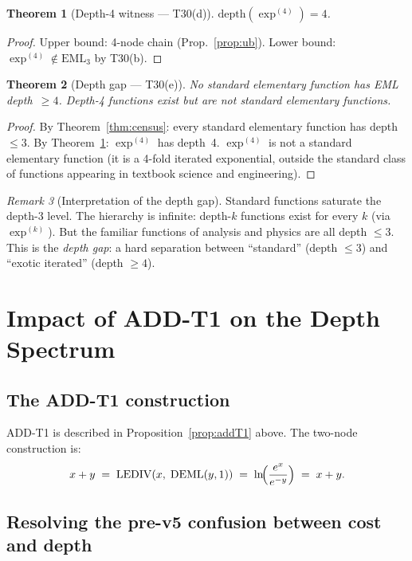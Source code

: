 \documentclass[12pt,a4paper]{article}
\newtheorem{theorem}{Theorem}[section]
\theoremstyle{definition}
\theoremstyle{remark}
\newtheorem{remark}[theorem]{Remark}
\begin{document}
\begin{theorem}[Depth-4 witness --- T30(d)]\label{thm:d4}
$\mathrm{depth}(\exp^{(4)}) = 4$.
\end{theorem}
\begin{proof}
Upper bound: 4-node chain (Prop.~\ref{prop:ub}).
Lower bound: $\exp^{(4)} \notin \mathrm{EML}_3$ by T30(b).
\end{proof}

\begin{theorem}[Depth gap --- T30(e)]\label{thm:gap}
No standard elementary function has EML depth~$\geq 4$.
Depth-4 functions exist but are not standard elementary functions.
\end{theorem}
\begin{proof}
By Theorem~\ref{thm:census}: every standard elementary function has depth $\leq 3$.
By Theorem~\ref{thm:d4}: $\exp^{(4)}$ has depth~4.
$\exp^{(4)}$ is not a standard elementary function (it is a 4-fold iterated exponential,
outside the standard class of functions appearing in textbook science and engineering).
\end{proof}

\begin{remark}[Interpretation of the depth gap]
Standard functions saturate the depth-3 level.
The hierarchy is infinite: depth-$k$ functions exist for every $k$ (via $\exp^{(k)}$).
But the familiar functions of analysis and physics are all depth $\leq 3$.
This is the \emph{depth gap}: a hard separation between ``standard'' (depth $\leq 3$) and
``exotic iterated'' (depth $\geq 4$).
\end{remark}

\section{Impact of ADD-T1 on the Depth Spectrum}
\label{sec:addT1}

\subsection{The ADD-T1 construction}

ADD-T1 is described in Proposition~\ref{prop:addT1} above.
The two-node construction is:
\[
  x + y \;=\; \mathrm{LEDIV}(x,\;\mathrm{DEML}(y,1))
  \;=\; \ln\!\Bigl(\frac{e^x}{e^{-y}}\Bigr)
  \;=\; x + y.
\]

\subsection{Resolving the pre-v5 confusion between cost and depth}
\end{document}
